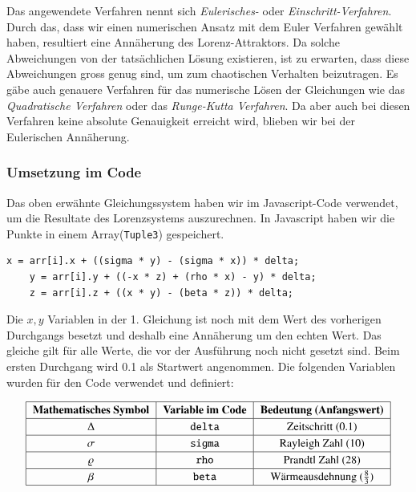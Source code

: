 Das angewendete Verfahren nennt sich \textit{Eulerisches-} oder \textit{Einschritt-Verfahren}. Durch das, dass wir einen numerischen Ansatz mit dem Euler Verfahren gewählt haben, resultiert eine Annäherung des Lorenz-Attraktors. Da solche Abweichungen von der tatsächlichen Lösung existieren, ist zu erwarten, dass diese Abweichungen gross genug sind, um zum chaotischen Verhalten beizutragen. Es gäbe auch genauere Verfahren für das numerische Lösen der Gleichungen wie das \textit{Quadratische Verfahren} oder das \textit{Runge-Kutta Verfahren}. Da aber auch bei diesen Verfahren keine absolute Genauigkeit erreicht wird, blieben wir bei der Eulerischen Annäherung. 

\subsubsection{Umsetzung im Code}

Das oben erwähnte Gleichungssystem haben wir im Javascript-Code verwendet, um die Resultate des Lorenzsystems auszurechnen. In Javascript haben wir die Punkte in einem Array(\texttt{Tuple3}) gespeichert.

	\begin{lstlisting}[style=C]
	x = arr[i].x + ((sigma * y) - (sigma * x)) * delta;
	y = arr[i].y + ((-x * z) + (rho * x) - y) * delta;
	z = arr[i].z + ((x * y) - (beta * z)) * delta;
	\end{lstlisting}

Die $ x, y $ Variablen in der 1. Gleichung ist noch mit dem Wert des vorherigen Durchgangs besetzt und deshalb eine Annäherung um den echten Wert. Das gleiche gilt für alle Werte, die vor der Ausführung noch nicht gesetzt sind. Beim ersten Durchgang wird 0.1 als Startwert angenommen. Die folgenden Variablen wurden für den Code verwendet und definiert:

\begin{align}
{\renewcommand{\arraystretch}{1.2}
	\begin{tabular}{| c | c | c |}
		\hline
		\textbf{Mathematisches Symbol} & \textbf{Variable im Code} & \textbf{Bedeutung (Anfangswert)}\\\hline
		$ \Delta $ & \texttt{delta} & Zeitschritt (0.1) \\\hline
		$ \sigma $ & \texttt{sigma} & Rayleigh Zahl (10)\\\hline
		$\varrho $ & \texttt{rho} & Prandtl Zahl (28)\\\hline
		$\beta $ & \texttt{beta}  & Wärmeausdehnung ($\frac{8}{3}$)\\\hline
	\end{tabular}
}
\end{align}

